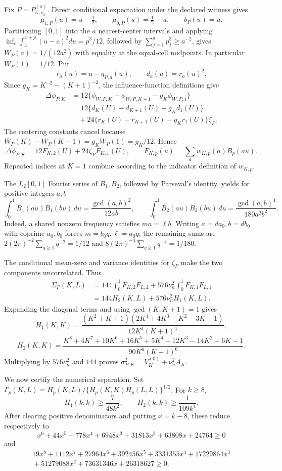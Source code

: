 Fix \(P=P_{U,\nu_n}^{(n)}\).  Direct conditional expectation under the declared witness gives
\[
 \mu_{1,P}(u)=u-\tfrac12,\qquad \mu_{0,P}(u)=\tfrac12-u,\qquad b_P(u)=u.
\]
Partitioning \([0,1]\) into the \(a\) nearest-center intervals and applying
\(\inf_c\int_x^{x+p}(u-c)^2du=p^3/12\), followed by
\(\sum_{j=1}^ap_j^3\geq a^{-2}\), gives \(W_P(a)=1/(12a^2)\) with equality at the equal-cell midpoints.  In particular \(W_P(1)=1/12\).  Put
\[
 r_a(u)=u-q_{P,a}(u),\qquad d_a(u)=r_a(u)^2.
\]
Since \(g_K=K^{-2}-(K+1)^{-2}\), the influence-function definitions give
\[
 \begin{aligned}
 \Delta\phi_{P,K}
 &=12\{\phi_{W,P,K}-\phi_{W,P,K+1}-g_K\phi_{W,P,1}\}\\
 &=12\{d_K(U)-d_{K+1}(U)-g_Kd_1(U)\}\\
 &\quad+24\{r_K(U)-r_{K+1}(U)-g_Kr_1(U)\}\zeta_P.
 \end{aligned}
\]
The centering constants cancel because \(W_P(K)-W_P(K+1)=g_KW_P(1)=g_K/12\).  Hence
\[
 \Delta\phi_{P,K}=12F_{K,2}(U)+24\zeta_PF_{K,1}(U),\qquad
 F_{K,p}(u)=\sum_aw_{K,p}(a)B_p(au).
\]
Repeated indices at \(K=1\) combine according to the indicator definition of \(w_{K,p}\).

The \(L_2[0,1]\) Fourier series of \(B_1,B_2\), followed by Parseval's identity, yields for positive integers \(a,b\)
\[
 \int_0^1B_1(au)B_1(bu)\,du=\frac{\gcd(a,b)^2}{12ab},\qquad
 \int_0^1B_2(au)B_2(bu)\,du=\frac{\gcd(a,b)^4}{180a^2b^2}.
\]
Indeed, a shared nonzero frequency satisfies \(ma=\ell b\).  Writing \(a=da_0,b=db_0\) with coprime \(a_0,b_0\) forces \(m=b_0q,\ell=a_0q\); the remaining sums are \(2(2\pi)^{-2}\sum_{q\geq1}q^{-2}=1/12\) and \(8(2\pi)^{-4}\sum_{q\geq1}q^{-4}=1/180\).

The conditional mean-zero and variance identities for \(\zeta_P\) make the two components uncorrelated.  Thus
\[
 \begin{aligned}
 \Sigma_P(K,L)
 &=144\int_0^1F_{K,2}F_{L,2}
 +576\nu_n^2\int_0^1F_{K,1}F_{L,1}\\
 &=144H_2(K,L)+576\nu_n^2H_1(K,L).
 \end{aligned}
\]
Expanding the diagonal terms and using \(\gcd(K,K+1)=1\) gives
\[
 H_1(K,K)=\frac{(K^2+K+1)(2K^4+4K^3-K^2-3K-1)}
 {12K^4(K+1)^4},
\]
\[
 H_2(K,K)=\frac{K^8+4K^7+10K^6+16K^5+5K^4-12K^3-14K^2-6K-1}
 {90K^6(K+1)^6}.
\]
Multiplying by \(576\nu_n^2\) and \(144\) proves
\(\sigma_{P,K}^2=V_K^{(0)}+\nu_n^2A_K\).

We now certify the numerical separation.  Set
\(\Gamma_p(K,L)=H_p(K,L)/\{H_p(K,K)H_p(L,L)\}^{1/2}\).  For \(k\geq8\),
\[
 H_1(k,k)\geq\frac7{48k^2},\qquad H_2(k,k)\geq\frac1{109k^4}.
\]
After clearing positive denominators and putting \(x=k-8\), these reduce respectively to
\[
 x^6+44x^5+778x^4+6948x^3+31813x^2+63808x+24764\geq0
\]
and
\[
 \begin{aligned}
 19x^8+1112x^7+27964x^6+392456x^5+3331355x^4
 +17229864x^3\\
 {}+51279088x^2+73631346x+26318627\geq0.
 \end{aligned}
\]

